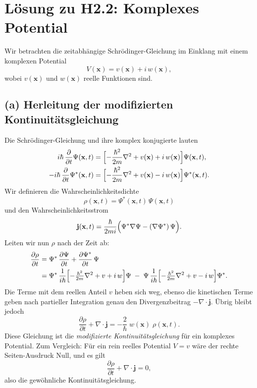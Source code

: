 \documentclass[a4paper,12pt]{article}
\begin{document}
\section*{Lösung zu H2.2: Komplexes Potential}

Wir betrachten die zeitabhängige Schrödinger-Gleichung im Einklang mit einem komplexen Potential
\[
V(\mathbf{x}) = v(\mathbf{x}) + i\,w(\mathbf{x}),
\]
wobei \(v(\mathbf{x})\) und \(w(\mathbf{x})\) reelle Funktionen sind.

\subsection*{(a) Herleitung der modifizierten Kontinuitätsgleichung}

Die Schrödinger-Gleichung und ihre komplex konjugierte lauten
\begin{align}
  i\hbar\,\frac{\partial}{\partial t}\Psi(\mathbf{x},t) &= \Bigl[-\frac{\hbar^2}{2m}\nabla^2 + v(\mathbf{x}) + i\,w(\mathbf{x})\Bigr]\Psi(\mathbf{x},t), \label{schroedinger}\\
  -i\hbar\,\frac{\partial}{\partial t}\Psi^*(\mathbf{x},t) &= \Bigl[-\frac{\hbar^2}{2m}\nabla^2 + v(\mathbf{x}) - i\,w(\mathbf{x})\Bigr]\Psi^*(\mathbf{x},t).
\end{align}
Wir definieren die Wahrscheinlichkeitsdichte
\[
\rho(\mathbf{x},t) = \Psi^*(\mathbf{x},t)\,\Psi(\mathbf{x},t)
\]
und den Wahrscheinlichkeitsstrom
\[
\mathbf{j}(\mathbf{x},t)
= \frac{\hbar}{2mi}\Bigl(\Psi^*\nabla\Psi - (\nabla\Psi^*)\,\Psi\Bigr).
\]
Leiten wir nun \(\rho\) nach der Zeit ab:
\begin{align*}
  \frac{\partial \rho}{\partial t}
  &= \Psi^*\,\frac{\partial \Psi}{\partial t}
     + \frac{\partial \Psi^*}{\partial t}\,\Psi \\
  &= \Psi^*\,
     \frac{1}{i\hbar}\Bigl[-\tfrac{\hbar^2}{2m}\nabla^2 + v + i\,w\Bigr]\Psi
     \;-\;\Psi\,
     \frac{1}{i\hbar}\Bigl[-\tfrac{\hbar^2}{2m}\nabla^2 + v - i\,w\Bigr]\Psi^*.
\end{align*}
Die Terme mit dem reellen Anteil \(v\) heben sich weg, ebenso die kinetischen Terme geben nach partieller Integration genau den Divergenzbeitrag \(-\nabla\cdot\mathbf{j}\). Übrig bleibt jedoch
\[
\frac{\partial \rho}{\partial t}
+ \nabla\cdot\mathbf{j}
= -\frac{2}{\hbar}\;w(\mathbf{x})\;\rho(\mathbf{x},t).
\]
Diese Gleichung ist die \emph{modifizierte Kontinuitätsgleichung} für ein komplexes Potential. 
Zum Vergleich: Für ein rein reelles Potential \(V=v\) wäre der rechte Seiten-Ausdruck Null, und es gilt
\[
\frac{\partial \rho}{\partial t} + \nabla\cdot\mathbf{j} = 0,
\]
also die gewöhnliche Kontinuitätsgleichung.
\end{document}
